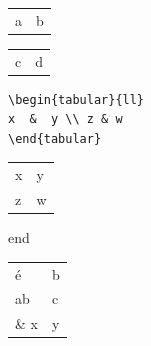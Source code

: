 \begin{tabular}{ll}
a  &  b \\
\end{tabular}
\begin{tabular}{ll}
c  &  d \\
\end{tabular}
\begin{verbatim}
\begin{tabular}{ll}
x  &  y \\ z & w
\end{tabular}
\end{verbatim}
\begin{tabular}{ll}
x  &  y \\ z & w
\end{tabular}
end
\begin{tabular}{ll}
é & b \\
ab & c \\
\& x & y \\
\end{tabular}
